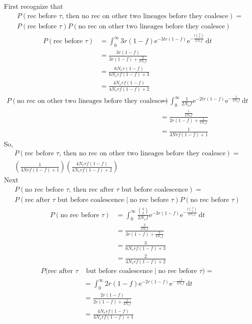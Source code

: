 \documentclass[reqno]{amsart}
\begin{document}
First recognize that
\begin{align}
	& P(\text{rec before } \tau \text{, then no rec on other two lineages before they coalesce}) = \\
	& P(\text{rec before } \tau)P(\text{no rec on other two lineages before they coalesce})
\end{align}
\begin{align}
	P(\text{rec before } \tau)&= \int_0^\infty 3r (1-f) \mathrm{e}^{-3tr(1-f)}\mathrm{e}^{-\frac{t\binom{3}{2}}{2N_ef}}\, \mathrm{d} t \\
	& = \frac{3r (1-f)}{3r(1-f) + \frac{3}{2N_ef}} \\
	& = \frac{6N_e r (1 -f )}{6N_e r f (1 -f ) + 3} \\
	& = \frac{4N_e r f (1 -f )}{4N_e r f (1 -f ) + 2}
\end{align}
\begin{align}
	P(\text{no rec on other two lineages before they coalesce}) & = \int_0^\infty\frac{1}{2N_ef}\mathrm{e}^{-2tr(1-f)}\mathrm{e}^{-\frac{t}{2N_e f}}\, \mathrm{d}t \\ 
	& = \frac{\frac{1}{2N_ef}}{2r(1-f) + \frac{1}{2N_e f}} \\
	& = \frac{1}{4Nrf(1-f) + 1}
\end{align}
So,
\begin{align}
	P(\text{rec before } \tau \text{, then no rec on other two lineages before they coalesce}) = \\
	\left(\frac{1}{4Nrf(1-f) + 1}\right)\left(\frac{4N_e r f (1 -f )}{4N_e r f (1 -f ) + 2}\right)
\end{align}
Next
\begin{align}
	 P(\text{no rec before }\tau \text{, then rec after } \tau \text{ but before coalescence})= \\
	 P(\text{rec after } \tau \text{ but before coalescence} \mid \text{no rec before }\tau)P(\text{no rec before }\tau )
\end{align}
\begin{align}
P(\text{no rec before }\tau ) & = \int_0^\infty\frac{\binom{3}{2}}{2N_e f}\mathrm{e}^{-3r(1-f)}\mathrm{e}^{-\frac{t\binom{3}{2}}{2N_e f}}\, \mathrm{d} t\\
	& =\frac{\frac{3}{2N_e f}}{3r(1-f) + \frac{3}{2N_e f}} \\
	& = \frac{3}{6N_erf(1-f) + 3} \\
	& = \frac{2}{4N_erf(1-f) + 2}
\end{align}
\begin{align}
	P(\text{rec after } \tau &\text{ but before coalescence} \mid \text{no rec before }\tau) = \\
	& = \int_0^\infty2r(1-f)\mathrm{e}^{-2r(1-f)}\mathrm{e}^{-\frac{-t}{2N_ef}}\, \mathrm{d}t \\
	& = \frac{2r(1-f)}{2r(1-f)+\frac{1}{2N_e f}} \\
	& = \frac{4N_e r f (1-f)}{4N_e r f (1-f) + 1}
\end{align}
\end{document}
